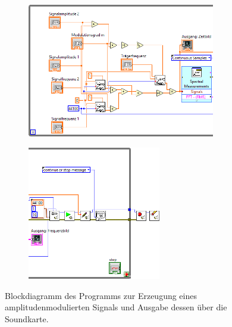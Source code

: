 \documentclass[
a4paper,
12pt,
pagesize,
ngerman
]{scrartcl}
\begin{document}
	\begin{figure}[H]
		\centering
		\begin{subfigure}[t]{1.0\textwidth}
			\centering
			\includegraphics[width=0.9\textwidth]{EIRE2018Dateien/Tag3/Soundkarteoutoszi/AMdTeil1}
		\end{subfigure}
		
		\vspace{0,2cm}
		
		\begin{subfigure}[t]{1.0\textwidth}
			\centering
			\includegraphics[width=0.64\textwidth]{EIRE2018Dateien/Tag3/Soundkarteoutoszi/AMdTeil2}
		\end{subfigure}
		\caption{Blockdiagramm des Programms zur Erzeugung eines amplitudenmodulierten Signals und Ausgabe dessen über die Soundkarte.}
		\label{fig_tag3_am_soundkarte_block}
	\end{figure}
	
	
\end{document}
